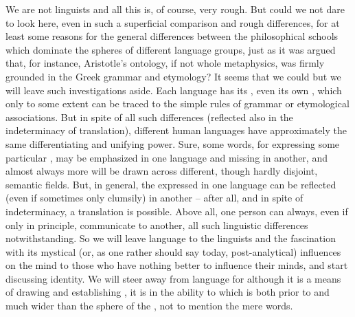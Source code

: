 \pa 
We are not linguists and all this is, of course, very rough. But could we not dare
to look here, even in such a superficial comparison and rough differences, for
at least some reasons for the
general differences between the philosophical schools which dominate the spheres
of different language groups, just as it was argued that, for instance,
Aristotle's ontology, 
if not whole metaphysics, was firmly grounded in the Greek grammar and etymology?
It seems that we could but we will leave such investigations aside. 
Each language has its , even its own , which only to some
extent can be traced to the simple rules of grammar or etymological
associations.  But in spite of all such differences (reflected also in the
indeterminacy of translation), different human languages have approximately the
same differentiating and unifying power.  Sure, some words, for expressing some
particular , may be emphasized in one language and missing in
another, and almost always more  will be drawn across
different, though hardly disjoint, semantic fields.  But, in general, the
 expressed in one language can be reflected (even if sometimes
only clumsily) in another -- after all, and in spite of indeterminacy, a
translation is possible. Above all, one person can always, even if only in
principle, communicate to another, all such linguistic differences
notwithstanding. So we will leave language to the
linguists and the fascination with its mystical (or, as one rather should say
today, post-analytical) influences on the mind to those who have nothing better
to influence their minds, and start discussing identity.  We will steer away
from language for although it is a means of drawing and establishing
, it is  in the ability to  which
is both prior to and much wider than the sphere of the , not to
mention the mere words.



